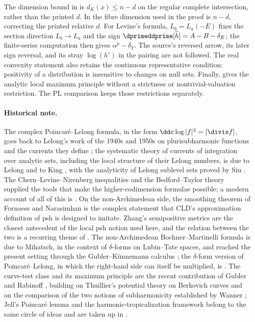 The dimension bound in \cite[\S18.7.1]{CLD25} is $d_K(x)\le n-d$
on the regular complete intersection, rather than the printed $d$.
In \cite[Proposition~18.7.3]{CLD25} the fibre dimension used in the proof
is $n-d$, correcting the printed relative $d$.  For Levine's formula,
$L_b=L_a(-E)$ fixes the section direction $L_b\to L_a$ and the sign
$\dprimeddprime[\widetilde h]=A-B-\delta_E$; the finite-series computation
then gives $\alpha^p-\delta_Y$.  The source's reversed arrow, its later
sign reversal, and its stray $\log(h')$ in the pairing are not followed.
The real convexity statement also retains the continuous representative
condition: positivity of a distribution is insensitive to changes on null
sets.  Finally, \cite[Theorem~6.1]{GR25Classical} gives the analytic local
maximum principle without a strictness or nontrivial-valuation restriction.
The PL comparison keeps those restrictions separately.

\paragraph{Historical note.}
The complex Poincar\'e--Lelong formula, in the form
$\ddc\log|f|^2=[\divis f]$, goes back to Lelong's work of the 1940s and
1950s on plurisubharmonic functions and the currents they define
\cite{Lel45,Lel68}; the systematic theory of currents of integration over
analytic sets, including the local structure of their Lelong numbers, is due
to Lelong and to King \cite{Kin71}, with the analyticity of Lelong sublevel
sets proved by Siu \cite{Siu74}.  The Chern--Levine--Nirenberg inequalities
\cite{CLN69} and the Bedford--Taylor theory \cite{BT76,BT82} supplied the
tools that make the higher-codimension formulae possible; a modern account of
all of this is \cite{DemBook}.  On the non-Archimedean side, the
smoothing theorem of Fornaess and Narasimhan \cite{FN80} is the complex
statement that CLD's approximation definition of psh is designed to imitate.
Zhang's semipositive metrics \cite{Zhang1995} are the closest antecedent of
the local psh notion used here, and the relation between the two is a
recurring theme of .  The
non-Archimedean Bochner--Martinelli formula is due to Mihatsch, in the
context of $\delta$-forms on Lubin--Tate spaces, and reached the present
setting through the Gubler--K\"unnemann calculus \cite{GK17,GK19}; the
$\delta$-form version of Poincar\'e--Lelong, in which the right-hand side can
itself be multiplied, is .  The curve-test
class and its maximum principle are the recent contribution of Gubler and
Rabinoff \cite{GR25Classical,GR25PL}, building on Thuillier's potential
theory on Berkovich curves \cite{Thu05} and on the comparison of the two
notions of subharmonicity established by Wanner \cite{Wanner19}; Jell's Poincar\'e lemma
\cite{Jell16} and the harmonic-tropicalization framework \cite{GJR26} belong
to the same circle of ideas and are taken up in .
